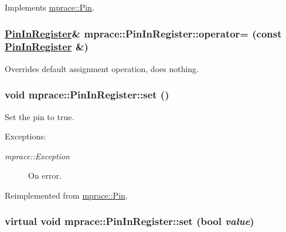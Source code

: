 Implements \hyperlink{classmprace_1_1Pin_a2}{mprace::Pin}.\hypertarget{classmprace_1_1PinInRegister_b1}{
\subsubsection[operator=]{\setlength{\rightskip}{0pt plus 5cm}\hyperlink{classmprace_1_1PinInRegister}{Pin\-In\-Register}\& mprace::Pin\-In\-Register::operator= (const \hyperlink{classmprace_1_1PinInRegister}{Pin\-In\-Register} \&)}}
\label{classmprace_1_1PinInRegister_b1}


Overrides default assignment operation, does nothing. 

\hypertarget{classmprace_1_1PinInRegister_a4}{
\subsubsection[set]{\setlength{\rightskip}{0pt plus 5cm}void mprace::Pin\-In\-Register::set ()}}
\label{classmprace_1_1PinInRegister_a4}


Set the pin to true. 

\begin{Desc}
\item[Exceptions:]
\begin{description}
\item[{\em mprace::Exception}]On error.\end{description}
\end{Desc}


Reimplemented from \hyperlink{classmprace_1_1Pin_a3}{mprace::Pin}.\hypertarget{classmprace_1_1PinInRegister_a2}{
\subsubsection[set]{\setlength{\rightskip}{0pt plus 5cm}virtual void mprace::Pin\-In\-Register::set (bool {\em value})}}
\label{classmprace_1_1PinInRegister_a2}


